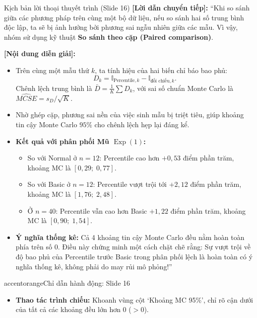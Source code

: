 \documentclass[10pt,a4paper]{article}
\begin{document}
\begin{scriptbox}{Kịch bản lời thoại thuyết trình (Slide 16)}
    \textbf{[Lời dẫn chuyển tiếp]:} ``Khi so sánh giữa các phương pháp trên cùng một bộ dữ liệu, nếu so sánh hai số trung bình độc lập, ta sẽ bị ảnh hưởng bởi phương sai ngẫu nhiên giữa các mẫu. Vì vậy, nhóm sử dụng kỹ thuật \textbf{So sánh theo cặp (Paired comparison)}.
    
    \textbf{[Nội dung diễn giải]:} 
    \begin{itemize}
        \item Trên cùng một mẫu thứ $k$, ta tính hiệu của hai biến chỉ báo bao phủ:
        \[
        D_k = \mathbb{I}_{\text{Percentile},k} - \mathbb{I}_{\text{đối chiếu},k}.
        \]
        Chênh lệch trung bình là $\bar D = \frac{1}{K}\sum D_k$, với sai số chuẩn Monte Carlo là $\widehat{MCSE} = s_D/\sqrt{K}$.
        \item Nhờ ghép cặp, phương sai nền của việc sinh mẫu bị triệt tiêu, giúp khoảng tin cậy Monte Carlo $95\%$ cho chênh lệch hẹp lại đáng kể.
        \item \textbf{Kết quả với phân phối Mũ $\operatorname{Exp}(1)$:}
        \begin{itemize}
            \item So với Normal ở $n=12$: Percentile cao hơn $+0{,}53$ điểm phần trăm, khoảng MC là $[0{,}29;\; 0{,}77]$.
            \item So với Basic ở $n=12$: Percentile vượt trội tới \textbf{$+2{,}12$} điểm phần trăm, khoảng MC là $[1{,}76;\; 2{,}48]$.
            \item Ở $n=40$: Percentile vẫn cao hơn Basic $+1{,}22$ điểm phần trăm, khoảng MC là $[0{,}90;\; 1{,}54]$.
        \end{itemize}
        \item \textbf{Ý nghĩa thống kê:} Cả 4 khoảng tin cậy Monte Carlo đều nằm hoàn toàn phía trên số $0$. Điều này chứng minh một cách chặt chẽ rằng: Sự vượt trội về độ bao phủ của Percentile trước Basic trong phân phối lệch là hoàn toàn có ý nghĩa thống kê, không phải do may rủi mô phỏng!''
    \end{itemize}
\end{scriptbox}

\begin{actionbox}{accentorange}{Chỉ dẫn hành động: Slide 16}
    \begin{itemize}
        \item \textbf{Thao tác trình chiếu:} Khoanh vùng cột `Khoảng MC 95\%', chỉ rõ cận dưới của tất cả các khoảng đều lớn hơn 0 ($>0$).
    \end{itemize}
\end{actionbox}
\end{document}
